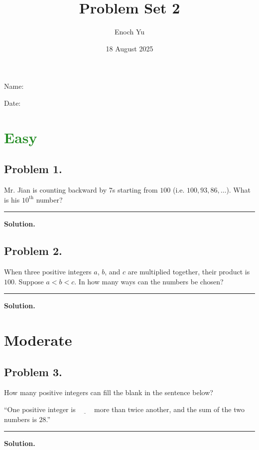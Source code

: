 \documentclass{article}
\title{Problem Set 2}
\author{Enoch Yu}
\date{18 August 2025}
\newcommand {\MyLine} {
    \smallskip \noindent\rule{\textwidth}{0.4pt} \smallskip
}
\begin{document}
Name:

Date:

\section*{\textcolor{ForestGreen}{Easy}}
\begin{minipage}[t][0.4\textheight][t]{\textwidth}
\subsection*{Problem 1.} %
{\color {Gray}
Mr. Jian is counting backward by $7$s starting
from $100$ (i.e. $100, 93, 86, \ldots$). What is
his $10^\text{th}$ number?
}

\MyLine

\textbf{Solution.}

\end{minipage}


\begin{minipage}[t][0.4\textheight][t]{\textwidth}
\subsection*{Problem 2.} %
{\color {Gray}
When three positive integers $a$, $b$, and $c$
are multiplied together, their product is $100$.
Suppose $a < b < c$. In how many ways can the numbers
be chosen?
}

\MyLine

\textbf{Solution.}

\end{minipage}


\newpage
\section*{\textcolor{YellowOrange}{Moderate}}
\begin{minipage}[t][0.45\textheight][t]{\textwidth}
\subsection*{Problem 3.} %
{\color {Gray}
How many positive integers can fill the blank in the
sentence below?

``One positive integer is $\underline{\qquad}$ more
than twice another, and the sum of the two numbers is
$28$.''
}

\MyLine

\textbf{Solution.}

\end{minipage}
\end{document}
